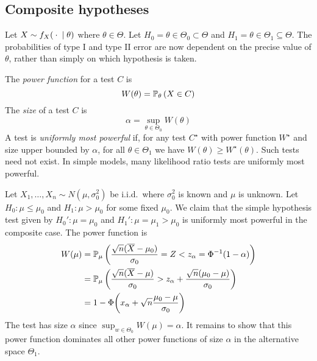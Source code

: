 \subsection{Composite hypotheses}
Let \( X \sim f_X({}\cdot{} \mid \theta) \) where \( \theta \in \Theta \).
Let \( H_0 = \theta \in \Theta_0 \subset \Theta \) and \( H_1 = \theta \in \Theta_1 \subseteq \Theta \).
The probabilities of type I and type II error are now dependent on the precise value of \( \theta \), rather than simply on which hypothesis is taken.
\begin{definition}
	The \textit{power function} for a test \( C \) is
	\[ W(\theta) = \mathbb{P}_{\theta}\left({X \in C}\right) \]
	The \textit{size} of a test \( C \) is
	\[ \alpha = \sup_{\theta \in \Theta_0} W(\theta) \]
	A test is \textit{uniformly most powerful} if, for any test \( C^\star \) with power function \( W^\star \) and size upper bounded by \( \alpha \), for all \( \theta \in \Theta_1 \) we have \( W(\theta) \geq W^\star(\theta) \).
	Such tests need not exist.
	In simple models, many likelihood ratio tests are uniformly most powerful.
\end{definition}
\begin{example}
	Let \( X_1, \dots, X_n \sim N(\mu, \sigma_0^2) \) be i.i.d.\ where \( \sigma_0^2 \) is known and \( \mu \) is unknown.
	Let \( H_0 \colon \mu \leq \mu_0 \) and \( H_1 \colon \mu > \mu_0 \) for some fixed \( \mu_0 \).
	We claim that the simple hypothesis test given by \( H_0' \colon \mu = \mu_0 \) and \( H_1' \colon \mu = \mu_1 > \mu_0 \) is uniformly most powerful in the composite case.
	The power function is
	\begin{align*}
		W(\mu) &= \mathbb{P}_{\mu}\left({\frac{\sqrt{n}(\overline X-\mu_0)}{\sigma_0} = Z < z_\alpha = \Phi^{-1}(1-\alpha)}\right) \\
		&= \mathbb{P}_{\mu}\left({\frac{\sqrt{n}(\overline X - \mu)}{\sigma_0} > z_\alpha + \frac{\sqrt{n}(\mu_0 - \mu)}{\sigma_0}}\right) \\
		&= 1 - \Phi\qty(x_\alpha + \sqrt{n} \frac{\mu_0 - \mu}{\sigma_0})
	\end{align*}
	The test has size \( \alpha \) since \( \sup_{w \in \Theta_0} W(\mu) = \alpha \).
	It remains to show that this power function dominates all other power functions of size \( \alpha \) in the alternative space \( \Theta_1 \).
\end{example}
